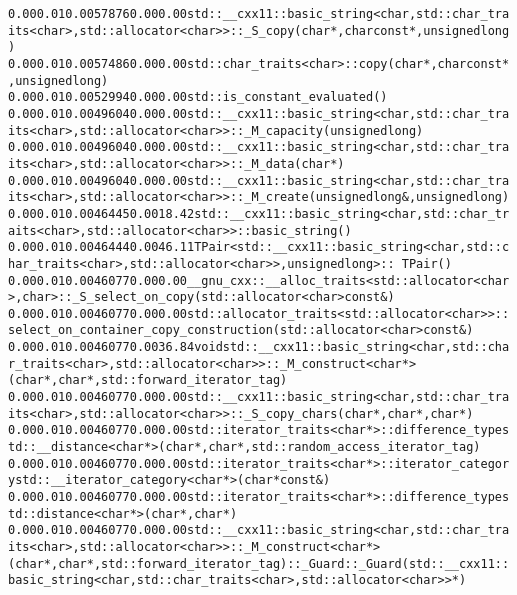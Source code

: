 \begin{alltt}
	0.00      0.01     0.00    57876     0.00     0.00  std::__cxx11::basic_string<char, std::char_traits<char>, std::allocator<char> >::_S_copy(char*, char const*, unsigned long)
	0.00      0.01     0.00    57486     0.00     0.00  std::char_traits<char>::copy(char*, char const*, unsigned long)
	0.00      0.01     0.00    52994     0.00     0.00  std::is_constant_evaluated()
	0.00      0.01     0.00    49604     0.00     0.00  std::__cxx11::basic_string<char, std::char_traits<char>, std::allocator<char> >::_M_capacity(unsigned long)
	0.00      0.01     0.00    49604     0.00     0.00  std::__cxx11::basic_string<char, std::char_traits<char>, std::allocator<char> >::_M_data(char*)
	0.00      0.01     0.00    49604     0.00     0.00  std::__cxx11::basic_string<char, std::char_traits<char>, std::allocator<char> >::_M_create(unsigned long&, unsigned long)
	0.00      0.01     0.00    46445     0.00    18.42  std::__cxx11::basic_string<char, std::char_traits<char>, std::allocator<char> >::basic_string()
	0.00      0.01     0.00    46444     0.00    46.11  TPair<std::__cxx11::basic_string<char, std::char_traits<char>, std::allocator<char> >, unsigned long>::~TPair()
	0.00      0.01     0.00    46077     0.00     0.00  __gnu_cxx::__alloc_traits<std::allocator<char>, char>::_S_select_on_copy(std::allocator<char> const&)
	0.00      0.01     0.00    46077     0.00     0.00  std::allocator_traits<std::allocator<char> >::select_on_container_copy_construction(std::allocator<char> const&)
	0.00      0.01     0.00    46077     0.00    36.84  void std::__cxx11::basic_string<char, std::char_traits<char>, std::allocator<char> >::_M_construct<char*>(char*, char*, std::forward_iterator_tag)
	0.00      0.01     0.00    46077     0.00     0.00  std::__cxx11::basic_string<char, std::char_traits<char>, std::allocator<char> >::_S_copy_chars(char*, char*, char*)
	0.00      0.01     0.00    46077     0.00     0.00  std::iterator_traits<char*>::difference_type std::__distance<char*>(char*, char*, std::random_access_iterator_tag)
	0.00      0.01     0.00    46077     0.00     0.00  std::iterator_traits<char*>::iterator_category std::__iterator_category<char*>(char* const&)
	0.00      0.01     0.00    46077     0.00     0.00  std::iterator_traits<char*>::difference_type std::distance<char*>(char*, char*)
	0.00      0.01     0.00    46077     0.00     0.00  std::__cxx11::basic_string<char, std::char_traits<char>, std::allocator<char> >::_M_construct<char*>(char*, char*, std::forward_iterator_tag)::_Guard::_Guard(std::__cxx11::basic_string<char, std::char_traits<char>, std::allocator<char> >*)

\end{alltt}
